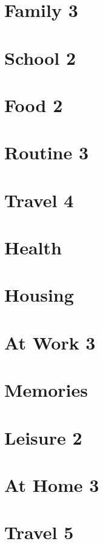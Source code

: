 \documentclass[a4paper,11pt,oneside]{book}
\begin{document}
\section{Family 3}
\section{School 2}
\section{Food 2}
\section{Routine 3}
\section{Travel 4}
\section{Health}
\section{Housing}
\section{At Work 3}
\section{Memories}
\section{Leisure 2}
\section{At Home 3}
\section{Travel 5}
\end{document}

